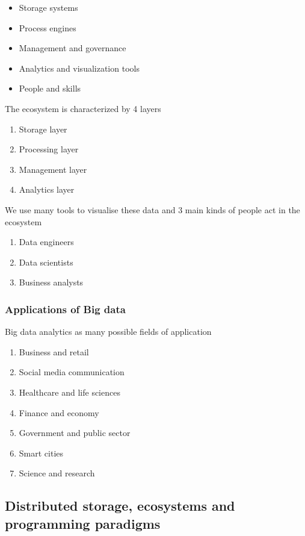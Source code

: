 \begin{itemize}
    \item Storage systems
    \item Process engines
    \item Management and governance
    \item Analytics and visualization tools
    \item People and skills
\end{itemize}

The ecosystem is characterized by 4 layers

\begin{enumerate}
    \item Storage layer
    \item Processing layer
    \item Management layer
    \item Analytics layer
\end{enumerate}

We use many tools to visualise these data and 3 main kinds of people act in the ecosystem

\begin{enumerate}
    \item Data engineers
    \item Data scientists
    \item Business analysts
\end{enumerate}

\subsubsection{Applications of Big data}

Big data analytics as many possible fields of application

\begin{enumerate}
    \item Business and retail
    \item Social media communication
    \item Healthcare and life sciences
    \item Finance and economy
    \item Government and public sector
    \item Smart cities
    \item Science and research
\end{enumerate}


\subsection{Distributed storage, ecosystems and programming paradigms}

